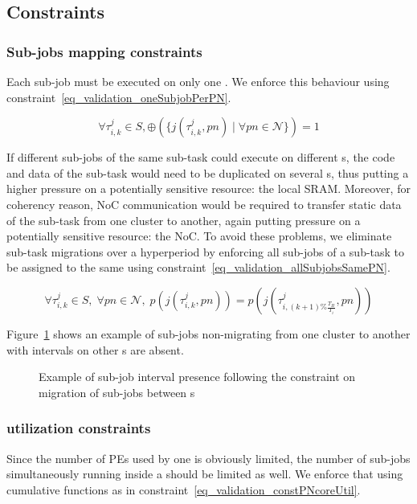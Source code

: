 \documentclass[main.tex]{subfiles}
\begin{document}
\subsection{Constraints}
\subsubsection{Sub-jobs mapping constraints}
Each sub-job must be executed on only one \PN{}. We enforce this behaviour
using constraint~\ref{eq_validation_oneSubjobPerPN}.

\begin{equation}
    \label{eq_validation_oneSubjobPerPN}
    \forall \tau_{i,k}^j \in S ,  
    \oplus(\{ j( \tau_{i,k}^j , pn ) \; | \; \forall pn \in \mathcal{N}\})=1
\end{equation}

If different sub-jobs of the same sub-task could execute on different \PN{}s,
the code and data of the sub-task would need to be duplicated on several
\PN{}s, thus putting a higher pressure on a potentially sensitive resource: the
local SRAM. Moreover, for coherency reason, NoC communication would be required
to transfer static data of the sub-task from one cluster to another, again
putting pressure on a potentially sensitive resource: the NoC. To avoid these
problems, we eliminate sub-task migrations over a hyperperiod by enforcing all
sub-jobs of a sub-task to be assigned to the same \PN{} using
constraint~\ref{eq_validation_allSubjobsSamePN}.

\begin{equation}
    \label{eq_validation_allSubjobsSamePN}
    \forall \tau_{i,k}^j \in S, \; \forall pn \in \mathcal{N}, \;
    p( j( \tau_{i,k}^j, pn )) = p( j( \tau_{i,(k+1) \% \frac{T_H}{T_i}}^j, pn ))
\end{equation}

Figure~\ref{fig_validation_constJobMapping} shows an example of sub-jobs
non-migrating from one cluster to another with intervals on other \PN{}s are
absent.

\begin{figure}
    \centering
    \scalebox{0.9}{}
    \caption{Example of sub-job interval presence following the constraint on
    migration of sub-jobs between \PN{}s }
    \label{fig_validation_constJobMapping}
\end{figure}

\subsubsection{\PN{} utilization constraints}
Since the number of PEs used by one \PN{} is obviously limited, the number of
sub-jobs simultaneously running inside a \PN{} should be limited as well. We
enforce that using cumulative functions as in
constraint~\ref{eq_validation_constPNcoreUtil}.
\end{document}
